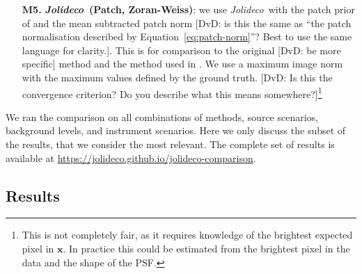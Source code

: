 \documentclass[twocolumn]{aastex631}
\newcommand{\jolideco}{\textit{Jolideco}~}
\newcommand{\dvd}[1]{{\color{red} [DvD: #1]}}
\begin{document}
\begin{enumerate}
        \item[\bf M5.] \textbf{\jolideco (Patch, Zoran-Weiss)}: we use \jolideco with the patch prior of \cite{Zoran2011} and the mean subtracted patch norm \dvd{is this the same as ``the patch normalisation described by Equation~\ref{eq:patch-norm}''? Best to use the same language for clarity.}. This is for comparison to the original \dvd{be more specific} method and the method used in \cite{Bouman2016}. We use a maximum image norm with the maximum values defined by the ground truth. \dvd{Is this the convergence criterion? Do you describe what this means somewhere?}\footnote{This is not completely fair, as it requires knowledge of the brightest expected pixel in $\mathbf{x}$. In practice this could be estimated from the brightest pixel in the data and the shape of the PSF.}
    \end{enumerate}

    We ran the comparison on all combinations of methods, source scenarios, background levels, and instrument scenarios. Here we only discuss the subset of the results, that we consider the most relevant. The complete set of results is available at \url{https://jolideco.github.io/jolideco-comparison}.

    \subsection{Results}
\end{document}
